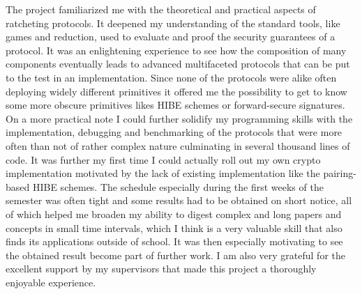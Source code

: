 \documentclass[11pt,a4paper,twoside,openright,bibliography=totoc]{scrbook}
\begin{document}
The project familiarized me with the theoretical and practical aspects
of ratcheting protocols.  It deepened my understanding of the standard
tools, like games and reduction, used to evaluate and proof the
security guarantees of a protocol. It was an enlightening experience
to see how the composition of many components eventually leads to
advanced multifaceted protocols that can be put to the test in an
implementation. Since none of the protocols were alike often deploying
widely different primitives it offered me the possibility to get to
know some more obscure primitives likes HIBE schemes or forward-secure
signatures. On a more practical note I could further solidify my
programming skills with the implementation, debugging and benchmarking
of the protocols that were more often than not of rather complex
nature culminating in several thousand lines of code. It was further
my first time I could actually roll out my own crypto implementation
motivated by the lack of existing implementation like the
pairing-based HIBE schemes. The schedule especially during the first
weeks of the semester was often tight and some results had to be
obtained on short notice, all of which helped me broaden my ability to
digest complex and long papers and concepts in small time intervals, which
I think is a very valuable skill that also finds its applications outside of
school. It was then especially motivating to see the obtained result
become part of further work. I am also very grateful for the excellent
support by my supervisors that made this project a thoroughly enjoyable
experience.




\listoffigures
\end{document}
